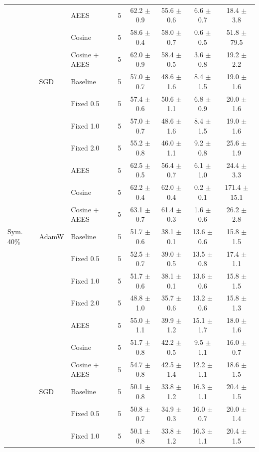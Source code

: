 \begin{table}[htbp]
{\begin{tabular}{lllccccc}
 &  & AEES & 5 & 62.2 $\pm$ 0.9 & 55.6 $\pm$ 0.6 & 6.6 $\pm$ 0.7 & 18.4 $\pm$ 3.8 \\
 &  & Cosine & 5 & 58.6 $\pm$ 0.4 & 58.0 $\pm$ 0.7 & 0.6 $\pm$ 0.5 & 51.8 $\pm$ 79.5 \\
 &  & Cosine + AEES & 5 & 62.0 $\pm$ 0.9 & 58.4 $\pm$ 0.5 & 3.6 $\pm$ 0.8 & 19.2 $\pm$ 2.2 \\
 & SGD & Baseline & 5 & 57.0 $\pm$ 0.7 & 48.6 $\pm$ 1.6 & 8.4 $\pm$ 1.5 & 19.0 $\pm$ 1.6 \\
 &  & Fixed 0.5 & 5 & 57.4 $\pm$ 0.6 & 50.6 $\pm$ 1.1 & 6.8 $\pm$ 0.9 & 20.0 $\pm$ 1.6 \\
 &  & Fixed 1.0 & 5 & 57.0 $\pm$ 0.7 & 48.6 $\pm$ 1.6 & 8.4 $\pm$ 1.5 & 19.0 $\pm$ 1.6 \\
 &  & Fixed 2.0 & 5 & 55.2 $\pm$ 0.8 & 46.0 $\pm$ 1.1 & 9.2 $\pm$ 0.8 & 25.6 $\pm$ 1.9 \\
 &  & AEES & 5 & 62.5 $\pm$ 0.5 & 56.4 $\pm$ 0.7 & 6.1 $\pm$ 1.0 & 24.4 $\pm$ 3.3 \\
 &  & Cosine & 5 & 62.2 $\pm$ 0.4 & 62.0 $\pm$ 0.4 & 0.2 $\pm$ 0.1 & 171.4 $\pm$ 15.1 \\
 &  & Cosine + AEES & 5 & 63.1 $\pm$ 0.7 & 61.4 $\pm$ 0.3 & 1.6 $\pm$ 0.6 & 26.2 $\pm$ 2.8 \\
\midrule
Sym. 40\% & AdamW & Baseline & 5 & 51.7 $\pm$ 0.6 & 38.1 $\pm$ 0.1 & 13.6 $\pm$ 0.6 & 15.8 $\pm$ 1.5 \\
 &  & Fixed 0.5 & 5 & 52.5 $\pm$ 0.7 & 39.0 $\pm$ 0.5 & 13.5 $\pm$ 0.8 & 17.4 $\pm$ 1.1 \\
 &  & Fixed 1.0 & 5 & 51.7 $\pm$ 0.6 & 38.1 $\pm$ 0.1 & 13.6 $\pm$ 0.6 & 15.8 $\pm$ 1.5 \\
 &  & Fixed 2.0 & 5 & 48.8 $\pm$ 1.0 & 35.7 $\pm$ 0.6 & 13.2 $\pm$ 0.6 & 15.8 $\pm$ 1.3 \\
 &  & AEES & 5 & 55.0 $\pm$ 1.1 & 39.9 $\pm$ 1.2 & 15.1 $\pm$ 1.7 & 18.0 $\pm$ 1.6 \\
 &  & Cosine & 5 & 51.7 $\pm$ 0.8 & 42.2 $\pm$ 0.5 & 9.5 $\pm$ 1.1 & 16.0 $\pm$ 0.7 \\
 &  & Cosine + AEES & 5 & 54.7 $\pm$ 0.8 & 42.5 $\pm$ 1.4 & 12.2 $\pm$ 1.1 & 18.6 $\pm$ 1.5 \\
 & SGD & Baseline & 5 & 50.1 $\pm$ 0.8 & 33.8 $\pm$ 1.2 & 16.3 $\pm$ 1.1 & 20.4 $\pm$ 1.5 \\
 &  & Fixed 0.5 & 5 & 50.8 $\pm$ 0.7 & 34.9 $\pm$ 0.3 & 16.0 $\pm$ 0.7 & 20.0 $\pm$ 1.4 \\
 &  & Fixed 1.0 & 5 & 50.1 $\pm$ 0.8 & 33.8 $\pm$ 1.2 & 16.3 $\pm$ 1.1 & 20.4 $\pm$ 1.5 \\

\end{tabular}}
\end{table}
